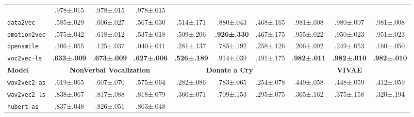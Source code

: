 \begin{table*}[]
\begin{tabular}{l|ccc|ccc|ccc}
    & .978\scriptsize±.015 
    & .978\scriptsize±.015 
    & .978\scriptsize±.015 \\
\texttt{data2vec} 
    & .585\scriptsize±.029 
    & .606\scriptsize±.027 
    & .567\scriptsize±.030 
    & .514\scriptsize±.171 
    & .880\scriptsize±.043 
    & .468\scriptsize±.165 
    & .981\scriptsize±.008 
    & .980\scriptsize±.007 
    & .981\scriptsize±.008 \\
\texttt{emotion2vec} 
    & .575\scriptsize±.042 
    & .618\scriptsize±.012 
    & .537\scriptsize±.018 
    & .509\scriptsize±.206 
    & \cellcolor[HTML]{D9EAD3}\textbf{.926\scriptsize±.330} 
    & .467\scriptsize±.175 
    & .955\scriptsize±.022 
    & .950\scriptsize±.023 
    & .951\scriptsize±.023 \\
\texttt{opensmile} 
    & .106\scriptsize±.055 
    & .125\scriptsize±.037 
    & .040\scriptsize±.011 
    & .281\scriptsize±.137 
    & .785\scriptsize±.192 
    & .258\scriptsize±.126 
    & .206\scriptsize±.092 
    & .249\scriptsize±.053 
    & .160\scriptsize±.050 \\
\texttt{voc2vec-ls} 
    & \cellcolor[HTML]{D9EAD3}\textbf{.633\scriptsize±.009} 
    & \cellcolor[HTML]{D9EAD3}\textbf{.673\scriptsize±.009} 
    & \cellcolor[HTML]{D9EAD3}\textbf{.627\scriptsize±.006} 
    & \cellcolor[HTML]{D9EAD3}\textbf{.526\scriptsize±.189} 
    & .914\scriptsize±.039 
    & .491\scriptsize±.175
    & \cellcolor[HTML]{D9EAD3}\textbf{.982\scriptsize±.011} 
    & \cellcolor[HTML]{D9EAD3}\textbf{.982\scriptsize±.010} 
    & \cellcolor[HTML]{D9EAD3}\textbf{.982\scriptsize±.010} \\
\midrule
\midrule
\textbf{Model} 
    & \multicolumn{3}{c}{\textbf{NonVerbal Vocalization}} 
    & \multicolumn{3}{c}{\textbf{Donate a Cry}} 
    & \multicolumn{3}{c}{\textbf{VIVAE}} \\
\midrule
\texttt{wav2vec2-as} 
    & .619\scriptsize±.065 
    & .607\scriptsize±.070 
    & .575\scriptsize±.064 
    & .282\scriptsize±.086 
    & .783\scriptsize±.065 
    & .254\scriptsize±.078 
    & .449\scriptsize±.058 
    & .448\scriptsize±.059 
    & .412\scriptsize±.059 \\
\texttt{wav2vec2-ls} 
    & .838\scriptsize±.067 
    & .817\scriptsize±.088 
    & .818\scriptsize±.079 
    & .360\scriptsize±.071 
    & .709\scriptsize±.153 
    & .295\scriptsize±.075 
    & .365\scriptsize±.162 
    & .375\scriptsize±.158 
    & .320\scriptsize±.194 \\
\texttt{hubert-as} 
    & .837\scriptsize±.048 
    & .826\scriptsize±.051 
    & .803\scriptsize±.048 

\end{tabular}
\end{table*}
